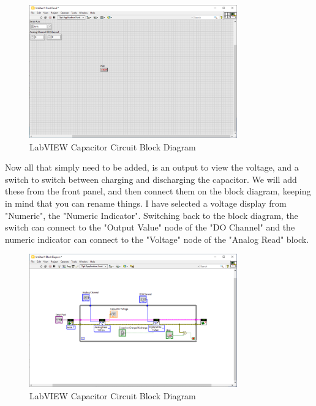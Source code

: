 \documentclass[a4paper,11pt]{report}
\begin{document}
\begin{figure}[H]
\centering
\includegraphics[width=0.8\textwidth]{screenshots/labviewcap5}
\caption{LabVIEW Capacitor Circuit Block Diagram}
\end{figure}

Now all that simply need to be added, is an output to view the voltage, and a switch to switch between charging and discharging the capacitor. We will add these from the front panel, and then connect them on the block diagram, keeping in mind that you can rename things. I have selected a voltage display from "Numeric", the "Numeric Indicator". Switching back to the block diagram, the switch can connect to the "Output Value" node of the "DO Channel" and the numeric indicator can connect to the "Voltage" node of the "Analog Read" block.

\begin{figure}[H]
\centering
\includegraphics[width=0.8\textwidth]{screenshots/labviewcap6}
\caption{LabVIEW Capacitor Circuit Block Diagram}
\end{figure}
\end{document}
